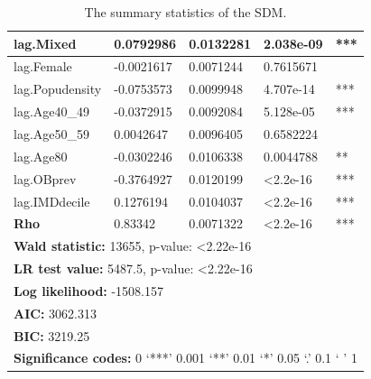 \begin{table}[]
\begin{tabular}{|l|l|l|l|l|}
lag.Mixed         & 0.0792986            & 0.0132281           & 2.038e-09        & ***                   \\ \hline
lag.Female        & -0.0021617           & 0.0071244           & 0.7615671        &                       \\ \hline
lag.Popudensity   & -0.0753573           & 0.0099948           & 4.707e-14        & ***                   \\ \hline
lag.Age40\_49     & -0.0372915           & 0.0092084           & 5.128e-05        & ***                   \\ \hline
lag.Age50\_59     & 0.0042647            & 0.0096405           & 0.6582224        &                       \\ \hline
lag.Age80         & -0.0302246           & 0.0106338           & 0.0044788        & **                    \\ \hline
lag.OBprev        & -0.3764927           & 0.0120199           & \textless 2.2e-16 & ***                   \\ \hline
lag.IMDdecile     & 0.1276194            & 0.0104037           & \textless 2.2e-16 & ***                   \\ \hline \hline
\textbf{Rho}              & 0.83342             & 0.0071322           & \textless 2.2e-16 & ***          \\ \hline \hline
\multicolumn{5}{|l|}{\textbf{Wald statistic:} 13655, p-value: \textless 2.22e-16} \\ \hline
\multicolumn{5}{|l|}{\textbf{LR test value:} 5487.5, p-value: \textless 2.22e-16} \\ \hline
\multicolumn{5}{|l|}{\textbf{Log likelihood:} -1508.157} \\ \hline
\multicolumn{5}{|l|}{\textbf{AIC:} 3062.313} \\ \hline
\multicolumn{5}{|l|}{\textbf{BIC:} 3219.25} \\ \hline \hline
\multicolumn{5}{|l|}{\textbf{Significance codes:} 0 ‘***’ 0.001 ‘**’ 0.01 ‘*’ 0.05 ‘.’ 0.1 ‘ ’ 1} \\ \hline
\end{tabular}
\caption{
The summary statistics of the SDM.
}
\label{tab: A4.8}
\end{table}

